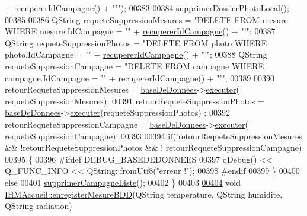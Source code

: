 \begin{DoxyCode}
{       + \hyperlink{class_i_h_m_accueil_a5e222617897b2c1f7e032fa851aa1700}{recupererIdCampagne}() + \textcolor{stringliteral}{"'"});
00383 
00384     \hyperlink{class_i_h_m_accueil_acb9679f51e140e0bc28d8ac10afd87e9}{supprimerDossierPhotoLocal}();
00385 
00386     QString requeteSuppressionMesures = \textcolor{stringliteral}{"DELETE FROM mesure WHERE mesure.IdCampagne = '"} + 
      \hyperlink{class_i_h_m_accueil_a5e222617897b2c1f7e032fa851aa1700}{recupererIdCampagne}() + \textcolor{stringliteral}{"'"};
00387     QString requeteSuppressionPhotos = \textcolor{stringliteral}{"DELETE FROM photo WHERE photo.IdCampagne = '"} + 
      \hyperlink{class_i_h_m_accueil_a5e222617897b2c1f7e032fa851aa1700}{recupererIdCampagne}() + \textcolor{stringliteral}{"'"};
00388     QString requeteSuppressionCampagne = \textcolor{stringliteral}{"DELETE FROM campagne WHERE campagne.IdCampagne = '"} + 
      \hyperlink{class_i_h_m_accueil_a5e222617897b2c1f7e032fa851aa1700}{recupererIdCampagne}() + \textcolor{stringliteral}{"'"};
00389 
00390     retourRequeteSuppressionMesures = \hyperlink{class_i_h_m_accueil_ab56d9846c071396a92f88272880e2c1f}{baseDeDonnees}->\hyperlink{class_base_de_donnees_aa8de5f8f8bb17edc43f5c0ee33712081}{executer}(
      requeteSuppressionMesures);
00391     retourRequeteSuppressionPhotos = \hyperlink{class_i_h_m_accueil_ab56d9846c071396a92f88272880e2c1f}{baseDeDonnees}->\hyperlink{class_base_de_donnees_aa8de5f8f8bb17edc43f5c0ee33712081}{executer}(requeteSuppressionPhotos)
      ;
00392     retourRequeteSuppressionCampagne = \hyperlink{class_i_h_m_accueil_ab56d9846c071396a92f88272880e2c1f}{baseDeDonnees}->\hyperlink{class_base_de_donnees_aa8de5f8f8bb17edc43f5c0ee33712081}{executer}(
      requeteSuppressionCampagne);
00393 
00394     \textcolor{keywordflow}{if}(!retourRequeteSuppressionMesures && !retourRequeteSuppressionPhotos && !
      retourRequeteSuppressionCampagne)
00395     \{
00396 \textcolor{preprocessor}{        #ifdef DEBUG\_BASEDEDONNEES}
00397             qDebug() << Q\_FUNC\_INFO << QString::fromUtf8(\textcolor{stringliteral}{"erreur !"});
00398 \textcolor{preprocessor}{        #endif}
00399     \}
00400     \textcolor{keywordflow}{else}
00401         \hyperlink{class_i_h_m_accueil_a36ce6ecca4e258562577bab1439e0a96}{supprimerCampagneListe}();
00402 \}
00403 
\hyperlink{class_i_h_m_accueil_af61976178829ec1fc756bec7eff0354d}{00404} \textcolor{keywordtype}{void} \hyperlink{class_i_h_m_accueil_af61976178829ec1fc756bec7eff0354d}{IHMAccueil::enregisterMesureBDD}(QString temperature, QString humidite, 
      QString radiation)
}
\end{DoxyCode}
